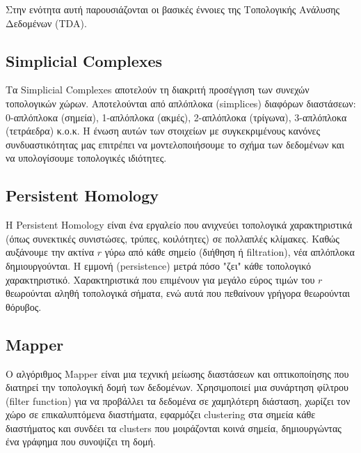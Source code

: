 \documentclass[12pt]{article}
\begin{document}
Στην ενότητα αυτή παρουσιάζονται οι βασικές έννοιες της Τοπολογικής Ανάλυσης Δεδομένων (\foreignlanguage{english}{TDA}).

\subsection{\foreignlanguage{english}{Simplicial Complexes}}
\vspace{1em}

Τα \foreignlanguage{english}{Simplicial Complexes} αποτελούν τη διακριτή προσέγγιση των συνεχών τοπολογικών χώρων. Αποτελούνται από απλόπλοκα (\foreignlanguage{english}{simplices}) διαφόρων διαστάσεων: 0-απλόπλοκα (σημεία), 1-απλόπλοκα (ακμές), 2-απλόπλοκα (τρίγωνα), 3-απλόπλοκα (τετράεδρα) κ.ο.κ. Η ένωση αυτών των στοιχείων με συγκεκριμένους κανόνες συνδυαστικότητας μας επιτρέπει να μοντελοποιήσουμε το σχήμα των δεδομένων και να υπολογίσουμε τοπολογικές ιδιότητες.

\subsection{\foreignlanguage{english}{Persistent Homology}}
\vspace{1em}

Η \foreignlanguage{english}{Persistent Homology} είναι ένα εργαλείο που ανιχνεύει τοπολογικά χαρακτηριστικά (όπως συνεκτικές συνιστώσες, τρύπες, κοιλότητες) σε πολλαπλές κλίμακες. Καθώς αυξάνουμε την ακτίνα $r$ γύρω από κάθε σημείο (διήθηση ή \foreignlanguage{english}{filtration}), νέα απλόπλοκα δημιουργούνται. Η εμμονή (\foreignlanguage{english}{persistence}) μετρά πόσο "ζει" κάθε τοπολογικό χαρακτηριστικό. Χαρακτηριστικά που επιμένουν για μεγάλο εύρος τιμών του $r$ θεωρούνται αληθή τοπολογικά σήματα, ενώ αυτά που πεθαίνουν γρήγορα θεωρούνται θόρυβος.

\subsection{\foreignlanguage{english}{Mapper}}
\vspace{1em}

Ο αλγόριθμος \foreignlanguage{english}{Mapper} είναι μια τεχνική μείωσης διαστάσεων και οπτικοποίησης που διατηρεί την τοπολογική δομή των δεδομένων. Χρησιμοποιεί μια συνάρτηση φίλτρου (\foreignlanguage{english}{filter function}) για να προβάλλει τα δεδομένα σε χαμηλότερη διάσταση, χωρίζει τον χώρο σε επικαλυπτόμενα διαστήματα, εφαρμόζει \foreignlanguage{english}{clustering} στα σημεία κάθε διαστήματος και συνδέει τα \foreignlanguage{english}{clusters} που μοιράζονται κοινά σημεία, δημιουργώντας ένα γράφημα που συνοψίζει τη δομή.
\end{document}
